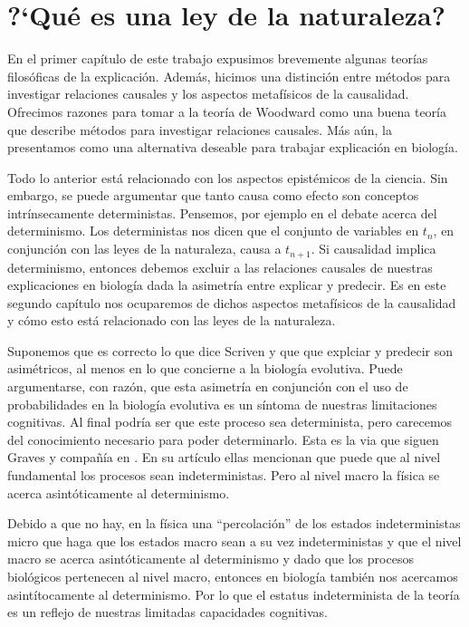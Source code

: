 
\chapter{?`Qué es una ley de la naturaleza?}

\noindent En el primer capítulo de este trabajo expusimos brevemente algunas teorías filosóficas de la explicación. Además, hicimos una distinción entre métodos para investigar relaciones causales y los aspectos metafísicos de la causalidad. Ofrecimos razones para tomar a la teoría de Woodward como una buena teoría que describe métodos para investigar relaciones causales. Más aún, la presentamos como una alternativa deseable para trabajar explicación en biología.

Todo lo anterior está relacionado con los aspectos epistémicos de la ciencia. Sin embargo, se puede argumentar que tanto causa como efecto son conceptos intrínsecamente deterministas. Pensemos, por ejemplo en el debate acerca del determinismo. Los deterministas nos dicen que el conjunto de variables en $t_{n}$, en conjunción con las leyes de la naturaleza, causa a $t_{n+1}$. Si causalidad implica determinismo, entonces debemos excluir a las relaciones causales de nuestras explicaciones en biología dada la asimetría entre explicar y predecir. Es en este segundo capítulo nos ocuparemos de dichos aspectos metafísicos de la causalidad y cómo esto está relacionado con las leyes de la naturaleza.

Suponemos que es correcto lo que dice Scriven y que que explciar y predecir son asimétricos, al menos en lo que concierne a la biología evolutiva. Puede argumentarse, con razón, que esta asimetría en conjunción con el uso de probabilidades en la biología evolutiva es un síntoma de nuestras limitaciones cognitivas. Al final podría ser que este proceso sea determinista, pero carecemos del conocimiento necesario para poder determinarlo. Esta es la via que siguen Graves y compañía en \citeyear{Graves1999}. En su artículo ellas mencionan que puede que al nivel fundamental los procesos sean indeterministas. Pero al nivel macro la física se acerca asintóticamente al determinismo.

Debido a que no hay, en la física una ``percolación'' de los estados indeterministas micro que haga que los estados macro sean a su vez indeterministas y que el nivel macro se acerca asintóticamente al determinismo y dado que los procesos biológicos pertenecen al nivel macro, entonces en biología también nos acercamos asintítocamente al determinismo. Por lo que el estatus indeterminista de la teoría es un reflejo de nuestras limitadas capacidades cognitivas.

